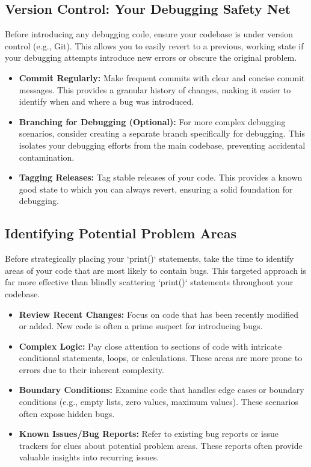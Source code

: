 \documentclass{article}
\begin{document}
\subsection*{Version Control: Your Debugging Safety Net}

Before introducing any debugging code, ensure your codebase is under version control (e.g., Git). This allows you to easily revert to a previous, working state if your debugging attempts introduce new errors or obscure the original problem.

\begin{itemize}
    \item \textbf{Commit Regularly:} Make frequent commits with clear and concise commit messages. This provides a granular history of changes, making it easier to identify when and where a bug was introduced.
    \item \textbf{Branching for Debugging (Optional):} For more complex debugging scenarios, consider creating a separate branch specifically for debugging. This isolates your debugging efforts from the main codebase, preventing accidental contamination.
    \item \textbf{Tagging Releases:} Tag stable releases of your code. This provides a known good state to which you can always revert, ensuring a solid foundation for debugging.
\end{itemize}

\subsection*{Identifying Potential Problem Areas}

Before strategically placing your `print()` statements, take the time to identify areas of your code that are most likely to contain bugs. This targeted approach is far more effective than blindly scattering `print()` statements throughout your codebase.

\begin{itemize}
    \item \textbf{Review Recent Changes:} Focus on code that has been recently modified or added.  New code is often a prime suspect for introducing bugs.
    \item \textbf{Complex Logic:} Pay close attention to sections of code with intricate conditional statements, loops, or calculations. These areas are more prone to errors due to their inherent complexity.
    \item \textbf{Boundary Conditions:} Examine code that handles edge cases or boundary conditions (e.g., empty lists, zero values, maximum values). These scenarios often expose hidden bugs.
    \item \textbf{Known Issues/Bug Reports:} Refer to existing bug reports or issue trackers for clues about potential problem areas. These reports often provide valuable insights into recurring issues.
\end{itemize}
\end{document}
